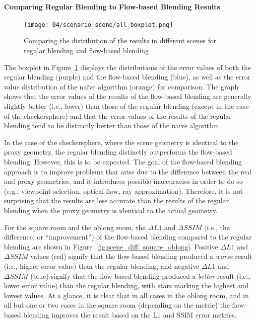 \paragraph{Comparing Regular Blending to Flow-based Blending Results}

\begin{figure}
		\centering
		\texttt{[image: 04/scenario\_scene/all\_boxplot.png]}
		\caption[The distribution of results in different scenes]{Comparing the distribution of the results in different scenes for regular blending and flow-based blending}
		\label{fig:scenario_scene_boxplot}
\end{figure}

The boxplot in Figure~\ref{fig:scenario_scene_boxplot} displays the distributions of the error values of both the regular blending (purple) and the flow-based blending (blue), as well as the error value distribution of the na\"ive algorithm (orange) for comparison\footnotemark. The graph shows that the error values of the results of the flow-based blending are generally slightly better (i.e., lower) than those of the regular blending (except in the case of the checkersphere) and that the error values of the results of the regular blending tend to be distinctly better than those of the na\"ive algorithm. 

In the case of the checkersphere, where the scene geometry is identical to the proxy geometry, the regular blending distinctly outperforms the flow-based blending. However, this is to be expected. The goal of the flow-based blending approach is to improve problems that arise due to the difference between the real and proxy geometries, and it introduces possible inaccuracies in order to do so (e.g., viewpoint selection, optical flow, ray approximation). Therefore, it is not surprising that the results are less accurate than the results of the regular blending when the proxy geometry is identical to the actual geometry.

For the square room and the oblong room, the $\Delta L1$ and $\Delta SSIM$ (i.e., the difference, or ``improvement'') of the flow-based blending compared to the regular blending are shown in Figure~\ref{fig:scene_diff_square_oblong}. Positive $\Delta L1$ and $\Delta SSIM$ values (red) signify that the flow-based blending produced a \emph{worse} result (i.e., higher error value) than the regular blending, and negative $\Delta L1$ and $\Delta SSIM$ (blue) signify that the flow-based blending produced a \emph{better} result (i.e., lower error value) than the regular blending, with stars marking the highest and lowest values. At a glance, it is clear that in all cases in the oblong room, and in all but one or two cases in the square room (depending on the metric) the flow-based blending improves the result based on the L1 and SSIM error metrics.

